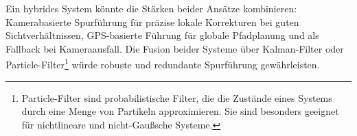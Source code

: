 Ein hybrides System könnte die Stärken beider Ansätze kombinieren: Kamerabasierte Spurführung für präzise lokale Korrekturen 
bei guten Sichtverhältnissen, GPS-basierte Führung für globale Pfadplanung und als Fallback bei Kameraausfall. Die Fusion 
beider Systeme über Kalman-Filter oder Particle-Filter\footnote{Particle-Filter sind probabilistische Filter, die die Zustände eines Systems durch eine Menge von Partikeln approximieren. Sie sind besonders geeignet für nichtlineare und nicht-Gaußsche Systeme.} würde robuste und redundante Spurführung gewährleisten.

 